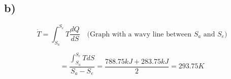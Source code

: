 

\subsection*{b)}
\[
\dot{T} = \int_{S_a}^{S_e} T \frac{dQ}{dS} \quad \text{(Graph with a wavy line between $S_a$ and $S_e$)}
\]

\[
= \frac{\int_{S_a}^{S_e} T dS}{S_a - S_e} = \frac{788.75 kJ + 283.75 kJ}{2} = 293.75 K
\]